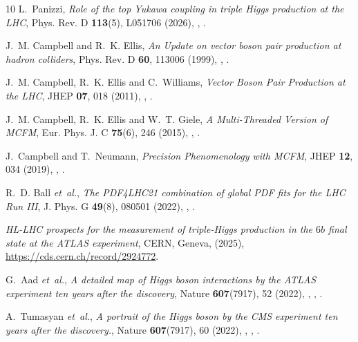 \documentclass{SciPost}
\begin{document}
\begin{thebibliography}{10}
L.~Panizzi,
\newblock \emph{{Role of the top Yukawa coupling in triple Higgs production at the LHC}},
\newblock Phys. Rev. D \textbf{113}(5), L051706 (2026),
\newblock {},
\newblock {}.

J.~M. Campbell and R.~K. Ellis,
\newblock \emph{{An Update on vector boson pair production at hadron colliders}},
\newblock Phys. Rev. D \textbf{60}, 113006 (1999),
\newblock {},
\newblock {}.

J.~M. Campbell, R.~K. Ellis and C.~Williams,
\newblock \emph{{Vector Boson Pair Production at the LHC}},
\newblock JHEP \textbf{07}, 018 (2011),
\newblock {},
\newblock {}.

J.~M. Campbell, R.~K. Ellis and W.~T. Giele,
\newblock \emph{{A Multi-Threaded Version of MCFM}},
\newblock Eur. Phys. J. C \textbf{75}(6), 246 (2015),
\newblock {},
\newblock {}.

J.~Campbell and T.~Neumann,
\newblock \emph{{Precision Phenomenology with MCFM}},
\newblock JHEP \textbf{12}, 034 (2019),
\newblock {},
\newblock {}.

R.~D. Ball \emph{et~al.},
\newblock \emph{{The PDF4LHC21 combination of global PDF fits for the LHC Run III}},
\newblock J. Phys. G \textbf{49}(8), 080501 (2022),
\newblock {},
\newblock {}.

\emph{{HL-LHC prospects for the measurement of triple-Higgs production in the $6b$ final state at the ATLAS experiment}},
\newblock CERN, Geneva, (2025),
\newblock \href{https://cds.cern.ch/record/2924772}{https://cds.cern.ch/record/2924772}.

G.~Aad \emph{et~al.},
\newblock \emph{{A detailed map of Higgs boson interactions by the ATLAS experiment ten years after the discovery}},
\newblock Nature \textbf{607}(7917), 52 (2022),
\newblock {},
,
\newblock {}.

A.~Tumasyan \emph{et~al.},
\newblock \emph{{A portrait of the Higgs boson by the CMS experiment ten years after the discovery.}},
\newblock Nature \textbf{607}(7917), 60 (2022),
\newblock {},
,
\newblock {}.


\end{thebibliography}
\end{document}
